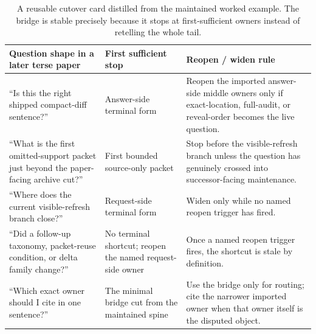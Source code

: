 \documentclass[11pt]{article}
\begin{document}
\begin{table}[t]
\centering
\small
\begin{tabularx}{\linewidth}{@{}l l X@{}}
\toprule
Question shape in a later terse paper & First sufficient stop & Reopen / widen rule \\
\midrule
``Is this the right shipped compact-diff sentence?'' & Answer-side terminal form & Reopen the imported answer-side middle owners only if exact-location, full-audit, or reveal-order becomes the live question. \\
``What is the first omitted-support packet just beyond the paper-facing archive cut?'' & First bounded source-only packet & Stop before the visible-refresh branch unless the question has genuinely crossed into successor-facing maintenance. \\
``Where does the current visible-refresh branch close?'' & Request-side terminal form & Widen only while no named reopen trigger has fired. \\
``Did a follow-up taxonomy, packet-reuse condition, or delta family change?'' & No terminal shortcut; reopen the named request-side owner & Once a named reopen trigger fires, the shortcut is stale by definition. \\
``Which exact owner should I cite in one sentence?'' & The minimal bridge cut from the maintained spine & Use the bridge only for routing; cite the narrower imported owner when that owner itself is the disputed object. \\
\bottomrule
\end{tabularx}
\caption{A reusable cutover card distilled from the maintained worked example. The bridge is stable precisely because it stops at first-sufficient owners instead of retelling the whole tail.}
\label{tab:spine-cutover-card}
\end{table}
\end{document}
